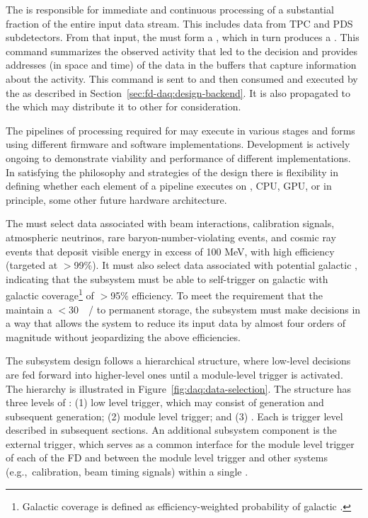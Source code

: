 The  is responsible for immediate and continuous processing of a substantial fraction of the entire input data stream. 
This includes data from TPC and PDS subdetectors.
From that input, the  must form a ,
which in turn produces a .
This command summarizes the observed activity that led to the decision
and provides addresses (in space and time) of the data in the  buffers that capture information about the activity.
This command is sent to and then consumed and executed by the  as described in Section~\ref{sec:fd-daq:design-backend}. 
It is also propagated to the  which may distribute it to other  for consideration.

The pipelines of processing required for  may execute in
various stages and forms using different firmware and software
implementations. 
Development is actively ongoing to demonstrate
viability and performance of different implementations. In satisfying
the philosophy and strategies of the  design there is 
flexibility in defining whether each element of a pipeline executes on
, CPU, GPU, or in principle, some other future hardware
architecture. 

The  must select data associated with beam interactions,
calibration signals, atmospheric neutrinos, rare baryon-number-violating events, and cosmic ray events that deposit visible energy in excess of 100 MeV, with high efficiency (targeted at $>$99\%). 
It must also select data associated with potential galactic , indicating that the  subsystem must be able to self-trigger on galactic  with galactic coverage\footnote{Galactic coverage is defined as efficiency-weighted probability of galactic .} of $>$95\% efficiency.
To meet the requirement that the   maintain a
$<$\SI{30}{\peta\byte/\year} to permanent storage, the 
subsystem must make  decisions in a way that allows the  
system to reduce its input data by almost four orders of magnitude
without jeopardizing the above efficiencies.

The  subsystem design follows a hierarchical structure, where low-level
decisions are fed forward into higher-level ones until a  module-level trigger is activated. The hierarchy
is illustrated in Figure~\ref{fig:daq:data-selection}. The structure
has three levels of : (1) low level trigger, which may consist of
 generation and subsequent
 generation; (2) module level trigger; and (3) . Each is trigger level described in subsequent
sections. An additional subsystem component is the external trigger,
which serves as a common interface for the
module level trigger of each of the FD  and between
the module level trigger and other systems (e.g.,~calibration, beam
timing signals) within a single .

